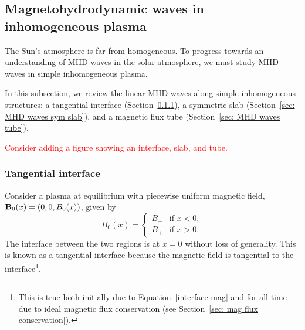 \documentclass[12pt]{../style-files/ociamthesis}
\begin{document}
\subsection{Magnetohydrodynamic waves in inhomogeneous plasma}
The Sun's atmosphere is far from homogeneous. To progress towards an understanding of MHD waves in the solar atmosphere, we must study MHD waves in simple inhomogeneous plasma.

In this subsection, we review the linear MHD waves along simple inhomogeneous structures: a tangential interface (Section~\ref{sec: MHD waves interface}), a symmetric slab (Section~\ref{sec: MHD waves sym slab}), and a magnetic flux tube (Section~\ref{sec: MHD waves tube}).

\textcolor{red}{Consider adding a figure showing an interface, slab, and tube.}

\subsubsection{Tangential interface} \label{sec: MHD waves interface}

Consider a plasma at equilibrium  with piecewise uniform magnetic field, $\mathbf{B}_0(x) = (0, 0, B_0(x))$, given by
\begin{equation}
	B_0(x) =
	\begin{cases}
		B_- & \text{if } x < 0, \\
		B_+ & \text{if } x > 0.
	\end{cases} \label{interface mag}
\end{equation}
The interface between the two regions is at $x = 0$ without loss of generality. This is known as a tangential interface because the magnetic field is tangential to the interface\footnote{This is true both initially due to Equation~\eqref{interface mag} and for all time due to ideal magnetic flux conservation (see Section~\ref{sec: mag flux conservation}).}.
\end{document}
